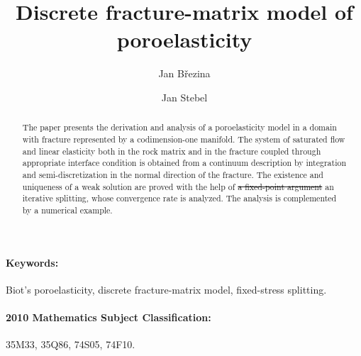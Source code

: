 \documentclass[a4paper]{article}
\numberwithin{equation}{section}
\def\js#1{{\color{blue}#1}}
\begin{document}
\title{Discrete fracture-matrix model of poroelasticity}
\author{Jan Březina}
\author{Jan Stebel}
\maketitle

\begin{abstract}
The paper presents the derivation and analysis of a poroelasticity model in a domain with fracture represented by a codimension-one manifold. The system of saturated flow and linear elasticity both in the rock matrix and in the fracture coupled through appropriate interface condition is obtained from a continuum description by integration and semi-discretization in the normal direction of the fracture.
The existence and uniqueness of a weak solution are proved with the help of \js{\sout{a fixed-point argument} an iterative splitting, whose convergence rate is analyzed}.
The analysis is complemented by a numerical example.
\end{abstract}

\paragraph{Keywords:}
Biot's poroelasticity, discrete fracture-matrix model, fixed-stress splitting.

\paragraph{2010 Mathematics Subject Classification:}
35M33, %
35Q86, %
74S05, %
74F10. %
\end{document}
